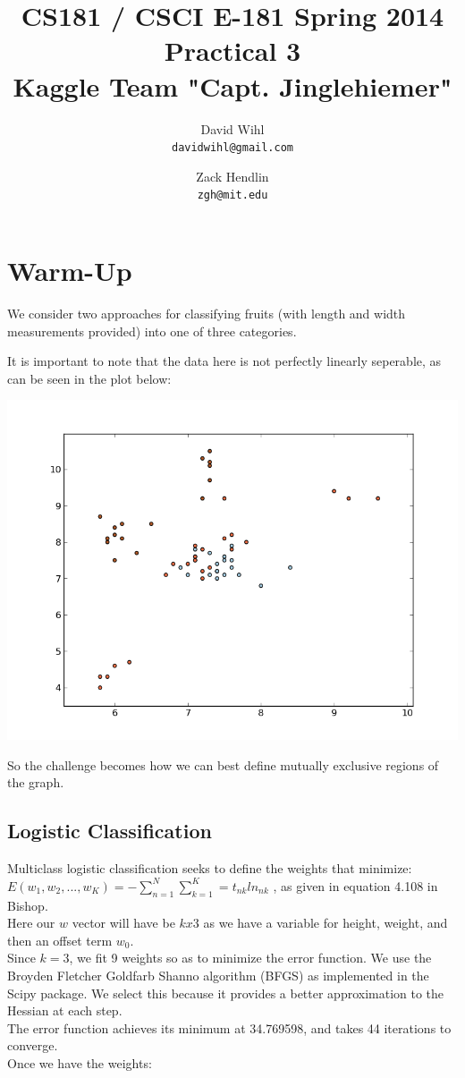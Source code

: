 \documentclass[11pt, oneside]{article}   	%
\title{CS181 / CSCI E-181 Spring 2014 Practical 3 \\ 
{\large Kaggle Team "Capt. Jinglehiemer"}
}
\author{
  David Wihl\\
  \texttt{davidwihl@gmail.com}
  \and
  Zack Hendlin\\
  \texttt{zgh@mit.edu} 
}
\begin{document}
\maketitle
\section*{Warm-Up}

We consider two approaches for classifying fruits (with length and width measurements provided) into one of three categories.

It is important to note that the data here is not perfectly linearly seperable, as can be seen in the plot below:

\includegraphics[scale=.6]{figure_3}

So the challenge becomes how we can best define mutually exclusive regions of the graph.

\subsection*{Logistic Classification}

Multiclass logistic classification seeks to define the weights that minimize:
\\
 $E(w_1, w_2, ..., w_K) =  -\sum\limits_{n=1}^N \sum\limits_{k=1}^K = t_{nk} ln_{nk}$ , 
as given in equation 4.108 in Bishop.
\
\\
Here our $w$ vector will have be $k x 3$ as we have a variable for height, weight, and then an offset term $w_0$.
\
\\
Since $k=3$, we fit 9 weights so as to minimize the error function. We use the Broyden Fletcher Goldfarb Shanno algorithm (BFGS) as implemented in the Scipy package. We select this because it provides a better approximation to the Hessian at each step.
\
\\
The error function achieves its minimum at 34.769598, and takes 44 iterations to converge.
\\
Once we have the weights:
\end{document}
